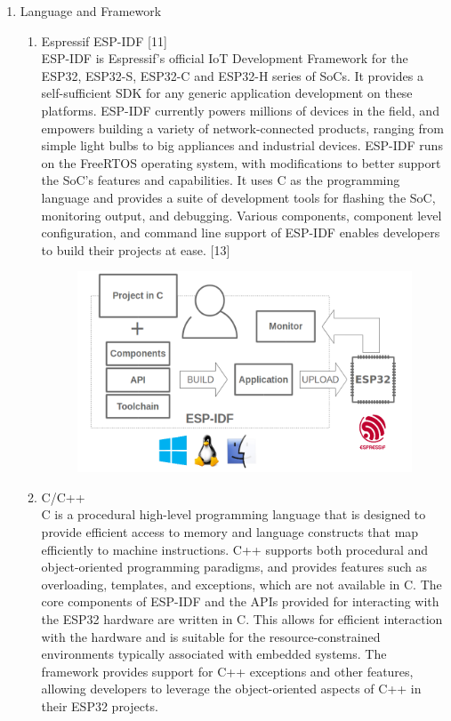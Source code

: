\documentclass[conference]{IEEEtran}
\begin{document}
\begin{enumerate}[label=\arabic*.]
\item Language and Framework\\
\begin{enumerate}[label=\alph*.]
\item Espressif ESP-IDF [11]\\
ESP-IDF is Espressif’s official IoT Development Framework for the ESP32, ESP32-S, ESP32-C and ESP32-H series of SoCs. It provides a self-sufficient SDK for any generic application development on these platforms. ESP-IDF currently powers millions of devices in the field, and empowers building a variety of network-connected products, ranging from simple light bulbs to big appliances and industrial devices. ESP-IDF runs on the FreeRTOS operating system, with modifications to better support the SoC's features and capabilities. It uses C as the programming language and provides a suite of development tools for flashing the SoC, monitoring output, and debugging. Various components, component level configuration, and command line support of ESP-IDF enables developers to build their projects at ease. [13]\\
\begin{figure}[H]\centering \includegraphics[scale=0.33]{images/esp-idf.png}\end{figure}
\item C/C++\\
C is a procedural high-level programming language that is designed to provide efficient access to memory and language constructs that map efficiently to machine instructions. C++ supports both procedural and object-oriented programming paradigms, and provides features such as overloading, templates, and exceptions, which are not available in C. The core components of ESP-IDF and the APIs provided for interacting with the ESP32 hardware are written in C. This allows for efficient interaction with the hardware and is suitable for the resource-constrained environments typically associated with embedded systems. The framework provides support for C++ exceptions and other features, allowing developers to leverage the object-oriented aspects of C++ in their ESP32 projects.\\

\end{enumerate}
\end{enumerate}
\end{document}
